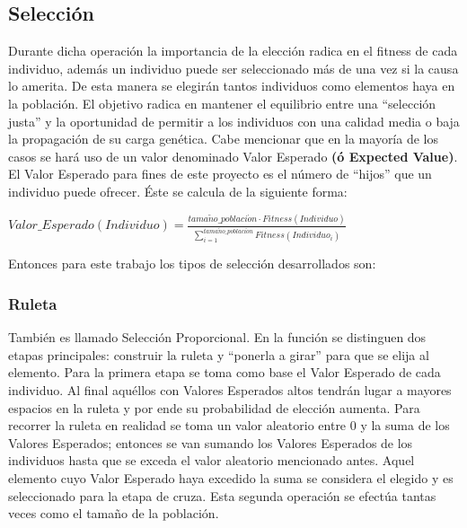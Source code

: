 \documentclass[class=report, crop=false]{standalone}
\begin{document}
\subsection{Selección}
\label{sec:c2_4}
Durante dicha operación la importancia de la elección radica 
en el fitness de cada individuo, además un individuo puede ser 
seleccionado más de una vez si la causa lo amerita.\break
De esta manera se elegirán tantos individuos como elementos haya 
en la población.\medskip\break
El objetivo radica en mantener el equilibrio entre una ``selección 
justa'' y la oportunidad de permitir a los individuos con una 
calidad media o baja la propagación de su carga genética.\medskip\break
Cabe mencionar que en la mayoría de los casos se hará uso de un
valor denominado Valor Esperado \textbf{(ó Expected Value)}. 
El Valor Esperado para fines de este proyecto es el número de 
``hijos'' que un individuo puede ofrecer. Éste se calcula de 
la siguiente forma:\medskip\break
\centerline{$Valor\_Esperado(Individuo) = \frac{tama\tilde{n}o\_poblaci\acute{o}n \cdot Fitness(Individuo)}{\sum_{i=1}^{tama\tilde{n}o\_poblaci\acute{o}n}Fitness(Individuo_i)}$}\medskip\break
Entonces para este trabajo los tipos de selección desarrollados 
son:

\subsubsection{Ruleta}
También es llamado Selección Proporcional.\break
En la función se distinguen dos etapas principales: construir 
la ruleta y ``ponerla a girar'' para que se elija al elemento.\break
Para la primera etapa se toma como base el Valor Esperado de 
cada individuo.\break
Al final aquéllos con Valores Esperados altos tendrán lugar 
a mayores espacios en la ruleta y por ende su probabilidad de 
elección aumenta.\medskip\break
Para recorrer la ruleta en realidad se toma un valor aleatorio 
entre 0 y la suma de los Valores Esperados; entonces se van 
sumando los Valores Esperados de los individuos hasta que se 
exceda el valor aleatorio mencionado antes.\break
Aquel elemento cuyo Valor Esperado haya excedido la suma se 
considera el elegido y es seleccionado para la etapa de cruza.\break
Esta segunda operación se efectúa tantas veces como el tamaño 
de la población.

\end{document}
